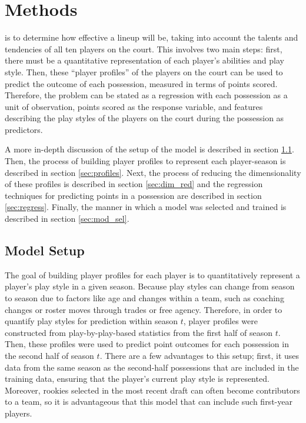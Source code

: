 
\chapter{Methods}
\label{ch:methods}

 is to determine how
effective a lineup will be, taking into account the talents and tendencies of all
ten players on the court. This involves two main steps: first, there must be a
quantitative representation of each player's abilities and play style. Then, these
``player profiles'' of the players on the court can be used to predict the outcome
of each possession, measured in terms of points scored. Therefore, the problem can
be stated as a regression with each possession as a unit of observation, points
scored as the response variable, and features describing the play styles of the
players on the court during the possession as predictors.

A more in-depth discussion of the setup of the model is described in section
\ref{sec:setup}. Then, the process of building player profiles to represent each
player-season is described in section \ref{sec:profiles}. Next, the process of
reducing the dimensionality of these profiles is described in section
\ref{sec:dim_red} and the regression techniques for predicting points in a
possession are described in section \ref{sec:regress}. Finally, the manner in which
a model was selected and trained is described in section \ref{sec:mod_sel}.

\section{Model Setup}
\label{sec:setup}

The goal of building player profiles for each player is to quantitatively represent
a player's play style in a given season. Because play styles can change from season
to season due to factors like age and changes within a team, such as coaching
changes or roster moves through trades or free agency. Therefore, in order to
quantify play styles for prediction within season $t$, player profiles were
constructed from play-by-play-based statistics from the first half of season $t$.
Then, these profiles were used to predict point outcomes for each possession in the
second half of season $t$. There are a few advantages to this setup; first, it uses
data from the same season as the second-half possessions that are included in the
training data, ensuring that the player's current play style is represented.
Moreover, rookies selected in the most recent draft can often become contributors to
a team, so it is advantageous that this model that can include such first-year
players.

